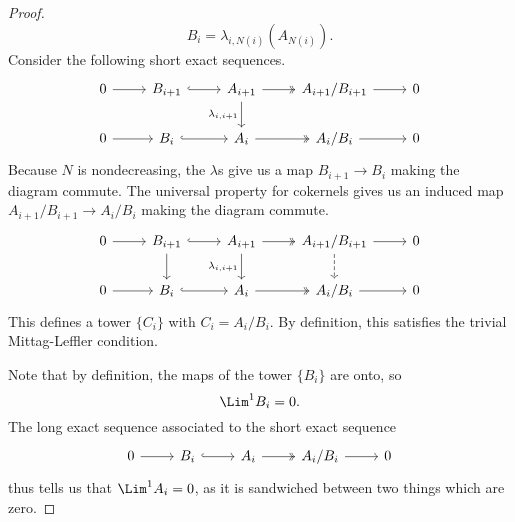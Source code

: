 \documentclass[main.tex]{subfiles}
\begin{document}
\begin{proof}
  \begin{equation*}
    B_{i} = \lambda_{i, N(i)}(A_{N(i)}).
  \end{equation*}
  Consider the following short exact sequences.
  \begin{equation*}
    \begin{tikzcd}
      0
      \arrow[r]
      & B_{i+1}
      \arrow[r, hook]
      & A_{i+1}
      \arrow[r, two heads]
      \arrow[d, swap, "\lambda_{i, i+1}"]
      & A_{i+1}/B_{i+1}
      \arrow[r]
      & 0
      \\
      0
      \arrow[r]
      & B_{i}
      \arrow[r, hook]
      & A_{i}
      \arrow[r, two heads]
      & A_{i}/B_{i}
      \arrow[r]
      & 0
    \end{tikzcd}
  \end{equation*}
  Because \(N\) is nondecreasing, the \(\lambda\)s give us a map \(B_{i+1} \to B_{i}\) making the diagram commute. The universal property for cokernels gives us an induced map \(A_{i+1}/B_{i+1} \to A_{i}/B_{i}\) making the diagram commute.
  \begin{equation*}
    \begin{tikzcd}
      0
      \arrow[r]
      & B_{i+1}
      \arrow[r, hook]
      \arrow[d]
      & A_{i+1}
      \arrow[r, two heads]
      \arrow[d, swap, "\lambda_{i, i+1}"]
      & A_{i+1}/B_{i+1}
      \arrow[r]
      \arrow[d, dashed]
      & 0
      \\
      0
      \arrow[r]
      & B_{i}
      \arrow[r, hook]
      & A_{i}
      \arrow[r, two heads]
      & A_{i}/B_{i}
      \arrow[r]
      & 0
    \end{tikzcd}
  \end{equation*}
  This defines a tower \(\{C_{i}\}\) with \(C_{i} = A_{i}/B_{i}\). By definition, this satisfies the trivial Mittag-Leffler condition.

  Note that by definition, the maps of the tower \(\{B_{i}\}\) are onto, so
  \begin{equation*}
    \Lim^{1} B_{i} = 0.
  \end{equation*}
  The long exact sequence associated to the short exact sequence
  \begin{equation*}
    \begin{tikzcd}
      0
      \arrow[r]
      & B_{i}
      \arrow[r, hook]
      & A_{i}
      \arrow[r, two heads]
      & A_{i}/B_{i}
      \arrow[r]
      & 0
    \end{tikzcd}
  \end{equation*}
  thus tells us that \(\Lim^{1} A_{i} = 0\), as it is sandwiched between two things which are zero.
\end{proof}
\end{document}
